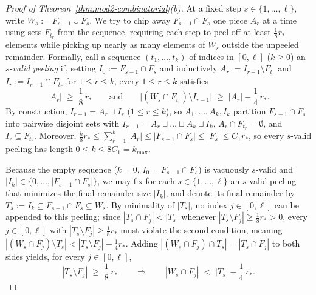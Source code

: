 \documentclass[11pt]{article}
\theoremstyle{definition}
\theoremstyle{remark}
\begin{document}
\begin{proof}[Proof of Theorem~\ref{thm:mod2-combinatorial}(b)]
At a fixed step $s \in \{1, \dots, \ell\}$, write $W_s := F_{s-1} \cup F_s$. We try to chip away $F_{s-1} \cap F_s$ one piece $A_r$ at a time using sets $F_{t_r}$ from the sequence, requiring each step to peel off at least $\frac{1}{8} r_*$ elements while picking up nearly as many elements of $W_s$ outside the unpeeled remainder. Formally, call a sequence $(t_1, \dots, t_k)$ of indices in $[0, \ell]$ ($k \ge 0$) an \emph{$s$-valid peeling} if, setting $I_0 := F_{s-1} \cap F_s$ and inductively $A_r := I_{r-1} \setminus F_{t_r}$ and $I_r := I_{r-1} \cap F_{t_r}$ for $1 \le r \le k$, every $1 \le r \le k$ satisfies
\[
|A_r| \;\ge\; \frac{1}{8}\,r_* \qquad \text{and} \qquad \bigl|(W_s \cap F_{t_r}) \setminus I_{r-1}\bigr| \;\ge\; |A_r| - \frac{1}{4}\,r_*.
\]
By construction, $I_{r-1} = A_r \sqcup I_r$ ($1 \le r \le k$), so $A_1, \dots, A_k, I_k$ partition $F_{s-1} \cap F_s$ into pairwise disjoint sets with $I_{r-1} = A_r \sqcup \dots \sqcup A_k \sqcup I_k$, $A_r \cap F_{t_r} = \emptyset$, and $I_r \subseteq F_{t_r}$. Moreover, $\frac{k}{8} r_* \le \sum_{r=1}^k |A_r| \le |F_{s-1} \cap F_s| \le |F_s| \le C_1 r_*$, so every $s$-valid peeling has length $0 \le k \le 8 C_1 = k_{\max}$.

Because the empty sequence ($k = 0$, $I_0 = F_{s-1} \cap F_s$) is vacuously $s$-valid and $|I_k| \in \{0, \dots, |F_{s-1} \cap F_s|\}$, we may fix for each $s \in \{1, \dots, \ell\}$ an $s$-valid peeling that minimizes the final remainder size $|I_k|$, and denote its final remainder by $T_s := I_k \subseteq F_{s-1} \cap F_s \subseteq W_s$. By minimality of $|T_s|$, no index $j \in [0, \ell]$ can be appended to this peeling; since $|T_s \cap F_j| < |T_s|$ whenever $|T_s \setminus F_j| \ge \frac{1}{8} r_* > 0$, every $j \in [0, \ell]$ with $|T_s \setminus F_j| \ge \frac{1}{8} r_*$ must violate the second condition, meaning $|(W_s \cap F_j) \setminus T_s| < |T_s \setminus F_j| - \frac{1}{4} r_*$. Adding $|(W_s \cap F_j) \cap T_s| = |T_s \cap F_j|$ to both sides yields, for every $j \in [0, \ell]$,
\begin{equation}
\label{eq:greedy-stability}
|T_s \setminus F_j| \;\ge\; \frac{1}{8}\,r_* \qquad \Longrightarrow \qquad |W_s \cap F_j| \;<\; |T_s| - \frac{1}{4}\,r_*.
\end{equation}


\end{proof}
\end{document}
